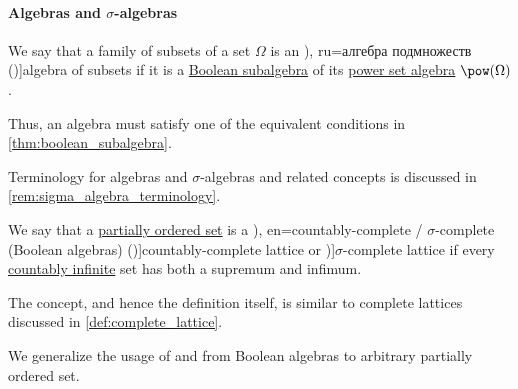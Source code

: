 \paragraph{Algebras and \( \sigma \)-algebras}

\begin{definition}\label{def:algebra_of_subsets}
  We say that a family of subsets of a set \( \Omega \) is an \term[bg=булева алгебра (\cite[def. 3.1]{Драганов2022ТеорияНаМярката}), ru=алгебра подмножеств (\cite[def. II.1.1]{Ширяев2007ВероятностьТом1})]{algebra of subsets} if it is a \hyperref[def:boolean_algebra/subobject]{Boolean subalgebra} of its \hyperref[def:power_set_algebra]{power set algebra} \( \pow(\Omega) \).
\end{definition}
\begin{comments}
  \item Thus, an algebra must satisfy one of the equivalent conditions in \cref{thm:boolean_subalgebra}.
  \item Terminology for algebras and \( \sigma \)-algebras and related concepts is discussed in \cref{rem:sigma_algebra_terminology}.
\end{comments}

\begin{definition}\label{def:countably_complete_lattice}\mimprovised
  We say that a \hyperref[def:partially_ordered_set]{partially ordered set} is a \term[ru=(Булева алгебра) счётного типа (\cite[\S 1.6.3]{Владимиров1969БулевыАлгебры}), en=countably-complete / \( \sigma \)-complete (Boolean algebras) (\cite[244]{HalmosGivant2009BooleanAlgebras})]{countably-complete lattice} or \term[en=\( \sigma \)-complete (Boolean algebras) (\cite[244]{HalmosGivant2009BooleanAlgebras})]{\( \sigma \)-complete lattice} if every \hyperref[def:aleph_zero_related_cardinalities]{countably infinite} set has both a supremum and infimum.
\end{definition}
\begin{comments}
  \item The concept, and hence the definition itself, is similar to complete lattices discussed in \cref{def:complete_lattice}.
  \item We generalize the usage of \cite[\S 1.6.3]{Владимиров1969БулевыАлгебры} and \cite[244]{HalmosGivant2009BooleanAlgebras} from Boolean algebras to arbitrary partially ordered set.
\end{comments}


